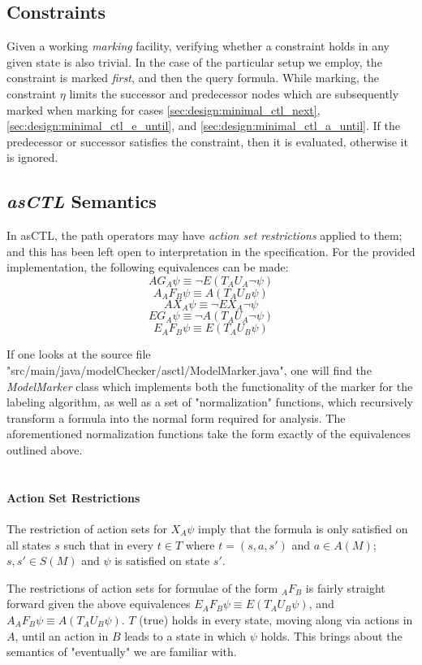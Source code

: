 \documentclass[]{article}
\begin{document}
\subsection{Constraints}
Given a working \emph{marking} facility, verifying whether a constraint holds in any given state is also trivial. In the case of the particular setup we employ, the constraint is marked \emph{first}, and then the query formula. While marking, the constraint $\eta$ limits the successor and predecessor nodes which are subsequently marked when marking for cases \ref{sec:design:minimal_ctl_next}, \ref{sec:design:minimal_ctl_e_until}, and \ref{sec:design:minimal_ctl_a_until}. If the predecessor or successor satisfies the constraint, then it is evaluated, otherwise it is ignored.

\subsection{\emph{asCTL} Semantics}\label{sec:design:asctl_semantics}
In asCTL, the path operators may have \emph{action set restrictions} applied to them; and this has been left open to interpretation in the specification. For the provided implementation, the following equivalences can be made:
$$AG_A \psi \equiv \lnot E (T _AU_A \lnot \psi)$$
$$A_AF_B \psi \equiv A (T _AU_B \psi)$$
$$AX_A \psi \equiv \lnot E X_A \lnot\psi$$
$$EG_A \psi \equiv \lnot A ( T _AU_A \lnot \psi)$$
$$E_AF_B \psi \equiv E ( T _AU_B \psi)$$

If one looks at the source file "src/main/java/modelChecker/asctl/ModelMarker.java", one will find the \emph{ModelMarker} class which implements both the functionality of the marker for the labeling algorithm, as well as a set of "normalization" functions, which recursively transform a formula into the normal form required for analysis. The aforementioned normalization functions take the form exactly of the equivalences outlined above.
\\\\
\paragraph{Action Set Restrictions}
The restriction of action sets for $X_A\psi$ imply that the formula is only satisfied on all states $s$ such that in every $t \in T$ where $t = (s, a, s')$ and $a \in A(M)$; $s, s' \in S(M)$ and $\psi$ is satisfied on state $s'$.

The restrictions of action sets for formulae of the form $_AF_B$ is fairly straight forward given the above equivalences $E_AF_B \psi \equiv E ( T _AU_B \psi)$, and $A_AF_B \psi \equiv A (T _AU_B \psi)$. $T$ (true) holds in every state, moving along via actions in $A$, until an action in $B$ leads to a state in which $\psi$ holds. This brings about the semantics of "eventually" we are familiar with.
\end{document}
